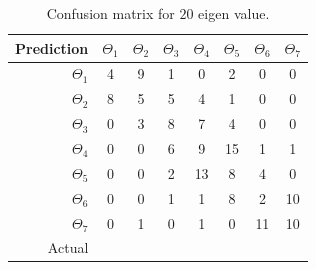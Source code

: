 \documentclass[runningheads,a4paper]{llncs}
\begin{document}
\begin{table}
\centering
\caption{Confusion matrix for $20$ eigen value.}
\label{tab:conf20}
\begin{tabular}{@{}r|ccccccc@{}}
\toprule
Prediction & \multicolumn{1}{r}{$\Theta_1$} & \multicolumn{1}{r}{$\Theta_2$} & \multicolumn{1}{r}{$\Theta_3$} & \multicolumn{1}{r}{$\Theta_4$} & \multicolumn{1}{r}{$\Theta_5$} & \multicolumn{1}{r}{$\Theta_6$} & \multicolumn{1}{r}{$\Theta_7$} \\ \midrule
$\Theta_1$ & 4                              & 9                              & 1                              & 0                              & 2                              & 0                              & 0                              \\
$\Theta_2$ & 8                              & 5                              & 5                              & 4                              & 1                              & 0                              & 0                              \\
$\Theta_3$ & 0                              & 3                              & 8                              & 7                              & 4                              & 0                              & 0                              \\
$\Theta_4$ & 0                              & 0                              & 6                              & 9                              & 15                             & 1                              & 1                              \\
$\Theta_5$ & 0                              & 0                              & 2                              & 13                             & 8                              & 4                              & 0                              \\
$\Theta_6$ & 0                              & 0                              & 1                              & 1                              & 8                              & 2                              & 10                             \\
$\Theta_7$ & 0                              & 1                              & 0                              & 1                              & 0                              & 11                             & 10                             \\ \midrule
Actual     & \multicolumn{1}{l}{}           & \multicolumn{1}{l}{}           & \multicolumn{1}{l}{}           & \multicolumn{1}{l}{}           & \multicolumn{1}{l}{}           & \multicolumn{1}{l}{}           & \multicolumn{1}{l}{}           \\ \cmidrule(r){1-1}
\end{tabular}
\end{table}
\end{document}
